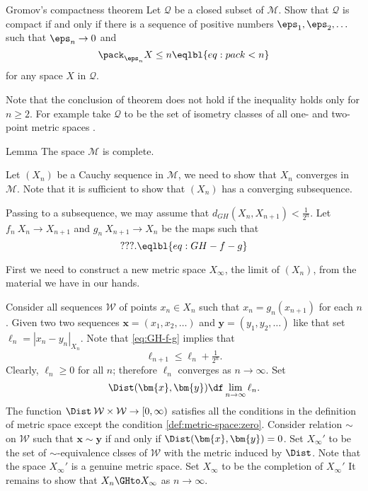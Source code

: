 \begin{thm}{Gromov's compactness theorem}\label{thm:gromov-compactness}%
Let $\mathcal{Q}$ be a closed subset of $\mathcal{M}$.
Show that $\mathcal{Q}$ is compact if and only if there is a sequence of positive numbers $\eps_1,\eps_2,\dots$ such that $\eps_n\to 0$ and 
$$\pack_{\eps_n}X\le n\eqlbl{eq:pack<n}$$
for any space $X$ in $\mathcal{Q}$.
\end{thm}

Note that the conclusion of theorem does not hold if the inequality holds only for $n\ge 2$.
For example take $\mathcal{Q}$ to be the set of isometry classes of all one- and two-point metric spaces .

\begin{thm}{Lemma}
The space $\mathcal{M}$ is complete.
\end{thm}

Let $(X_n)$ be a Cauchy sequence in $\mathcal{M}$,
we need to show that $X_n$ converges in $\mathcal{M}$.
Note that it is sufficient to show that $(X_n)$ has a converging subsequence.

Passing to a subsequence, we may assume that 
$d_{GH}(X_n,X_{n+1})< \tfrac1{2^n}$.
Let $f_n\:X_n\to X_{n+1}$ and $g_n\:X_{n+1}\to X_n$ be the maps such that
$$???.\eqlbl{eq:GH-f-g}$$

First we need to construct a new metric space $X_\infty$, the limit of $(X_n)$,
from the material we have in our hands.

Consider all sequences $\mathcal{W}$ of points $x_n\in X_n$ such that $x_n=g_n(x_{n+1})$ for each $n$.
Given two  two sequences $\bm{x}=(x_1,x_2,\dots)$ and $\bm{y}=(y_1,y_2,\dots)$ like that
set $\ell_n=|x_{n}-y_{n}|_{X_n}$.
Note that \ref{eq:GH-f-g} implies that 
$$\ell_{n+1}\le \ell_n+\tfrac1{2^n}.$$
Clearly, $\ell_n\ge 0$ for all $n$;
therefore $\ell_n$ converges as $n\to \infty$.
Set 
$$\Dist(\bm{x},\bm{y})
\df
\lim_{n\to\infty} \ell_n.$$
The function $\Dist\:\mathcal{W}\times\mathcal{W}\to[0,\infty)$
satisfies all the conditions in the definition of metric space 
except the condition \ref{def:metric-space:zero}.
Consider relation $\sim$ on $\mathcal{W}$ such that
$\bm{x}\sim \bm{y}$ 
if and only if $\Dist(\bm{x},\bm{y})=0$.
Set $X_\infty'$ to be the set of $\sim$-equivalence clsses of $\mathcal{W}$
with the metric induced by $\Dist$.
Note that the space $X_\infty'$ is a genuine %
metric space.
Set $X_\infty$ to be the completion of $X_\infty'$
It remains to show that $X_n\GHto X_\infty$ as $n\to \infty$. 

